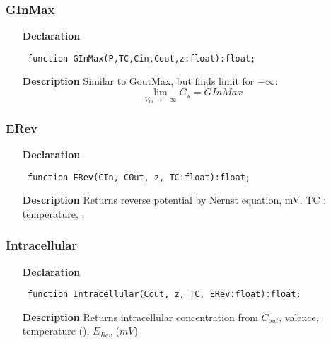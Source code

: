 \documentclass[12pt,a4paper,oneside]{report}
\newcommand{\declarationitem}[1]{\textbf{#1}}
\newcommand{\descriptiontitle}[1]{\textbf{#1}}
\newcommand{\code}[1]{\texttt{#1}}
\begin{document}
\subsubsection{GInMax}
\label{ugoldman-GInMax}
\begin{itemize}\item[\declarationitem{Declaration}\hfill]
	\begin{flushleft}
		\code{
			function GInMax(P,TC,Cin,Cout,z:float):float;}
		
	\end{flushleft}
	
	\par
	\item[\descriptiontitle{Description}]
	Similar to GoutMax, but finds limit for $-\infty$:
	$$
	\lim_{V_m\rightarrow-\infty}{G_s}=G{InMax}
	$$
	
\end{itemize}
\subsubsection{ERev}
\label{ugoldman-ERev}
\begin{itemize}\item[\declarationitem{Declaration}\hfill]
	\begin{flushleft}
		\code{
			function ERev(CIn, COut, z, TC:float):float;}
		
	\end{flushleft}
	
	\par
	\item[\descriptiontitle{Description}]
	Returns reverse potential by Nernst equation, mV. TC : temperature, \celsius.
	
\end{itemize}
\subsubsection{Intracellular}
\label{ugoldman-Intracellular}
\begin{itemize}\item[\declarationitem{Declaration}\hfill]
	\begin{flushleft}
		\code{
			function Intracellular(Cout, z, TC, ERev:float):float;}
		
	\end{flushleft}
	
	\par
	\item[\descriptiontitle{Description}]
	Returns intracellular concentration from $C_{out}$, valence, temperature (\celsius), $E_{Rev}$ ($mV$)
	
\end{itemize}
\end{document}
